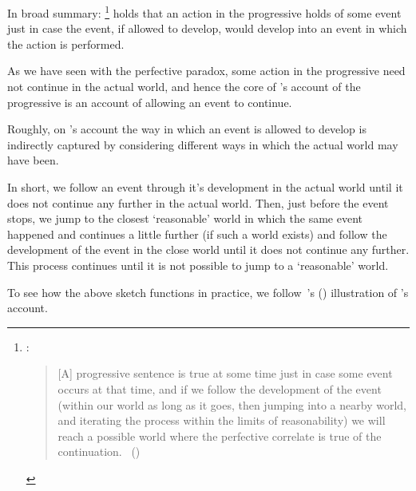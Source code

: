 \begin{note}
  In broad summary:%
  \footnote{
    \textcite{Szabo:2004ul}:
  \begin{quote}
    [A] progressive sentence is true at some time just in case some event occurs at that time, and if we follow the development of the event (within our world as long as it goes, then jumping into a nearby world, and iterating the process within the limits of reasonability) we will reach a possible world where the perfective correlate is true of the continuation.%
    \mbox{ }\hfill\mbox{(\citeyear[34]{Szabo:2004ul})}
  \end{quote}
  }
  \citeauthor{Landman:1992wh} holds that an action in the progressive holds of some event just in case the event, if allowed to develop, would develop into an event in which the action is performed.

  As we have seen with the perfective paradox, some action in the progressive need not continue in the actual world, and hence the core of \citeauthor{Landman:1992wh}'s account of the progressive is an account of allowing an event to continue.

  Roughly, on \citeauthor{Landman:1992wh}'s account the way in which an event is allowed to develop is indirectly captured by considering different ways in which the actual world may have been.

  In short, we follow an event through it's development in the actual world until it does not continue any further in the actual world.
  Then, just before the event stops, we jump to the closest `reasonable' world in which the same event happened and continues a little further (if such a world exists) and follow the development of the event in the close world until it does not continue any further.
  This process continues until it is not possible to jump to a `reasonable' world.
\end{note}

\begin{note}
  To see how the above sketch functions in practice, we follow~\citeauthor{Portner:1998um}'s (\citeyear[764--766]{Portner:1998um}) illustration of \citeauthor{Landman:1992wh}'s account.
\end{note}

